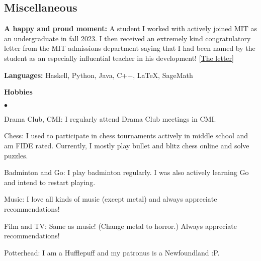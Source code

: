 \documentclass[margin,line, 10pt]{res}
\newenvironment{list2}{
  \begin{list}{$\bullet$}{%
      \setlength{\itemsep}{0in}
      \setlength{\parsep}{0in} \setlength{\parskip}{0in}
      \setlength{\topsep}{0in} \setlength{\partopsep}{0in} 
      \setlength{\leftmargin}{0.2in}}}{\end{list}}
\begin{document}
\begin{resume}
\section{\sc Miscellaneous}

{\bf A happy and proud moment:} A student I worked with actively joined MIT as an undergraduate in fall 2023. I then received an extremely kind congratulatory letter from the MIT admissions department saying that I had been named by the student as an especially influential teacher in his development! \hfill [\href{https://www.dropbox.com/scl/fi/3qgucmmeimm4omc644ikz/mit_atul.jpg?rlkey=mflk16ps5md13whz80o50t2yj&dl=0}{The letter}]

\vspace*{0.1mm}
{\bf Languages:} Haskell, Python, Java, C++, \LaTeX, SageMath

\vspace*{0.1mm}
{\bf Hobbies}
\begin{list2}
    \item Drama Club, CMI: I regularly attend Drama Club meetings in CMI.
    \item Chess: I used to participate in chess tournaments actively in middle school and am FIDE rated. Currently, I mostly play bullet and blitz chess online and solve puzzles.
    \item Badminton and Go: I play badminton regularly. I was also actively learning Go and intend to restart playing.
    \item Music: I love all kinds of music (except metal) and always appreciate recommendations!
    \item Film and TV: Same as music! (Change metal to horror.) Always appreciate recommendations!
    \item Potterhead: I am a Hufflepuff and my patronus is a Newfoundland :P.
\end{list2}



\end{resume}
\thispagestyle{lastpage}
\end{document}
